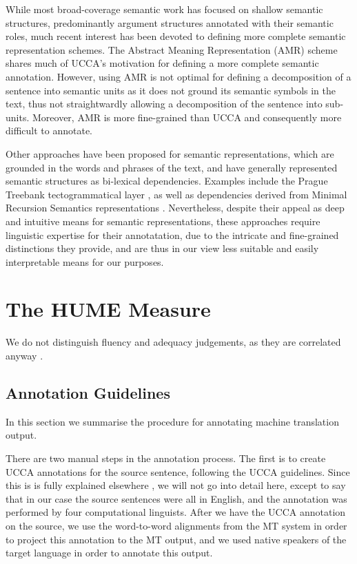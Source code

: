 \documentclass[11pt]{article}
\begin{document}
While most broad-coverage semantic work has focused on shallow semantic structures,
predominantly argument structures annotated with their semantic roles, much recent
interest has been devoted to defining more complete semantic representation schemes.
The Abstract Meaning Representation (AMR) scheme \cite{banarescu2013abstract}
shares much of UCCA's motivation for defining a more complete semantic annotation.
However, using AMR is not optimal for defining a decomposition of a sentence into semantic
units as it does not ground its semantic symbols in the text,
thus not straightwardly allowing a decomposition of the sentence into sub-units.
Moreover, AMR is more fine-grained than UCCA and consequently more difficult to annotate.

Other approaches have been proposed for semantic representations, which are grounded in the words
and phrases of the text, and have generally represented semantic structures as bi-lexical dependencies.
Examples include the Prague Treebank tectogrammatical layer \cite{hajic2012announcing}, as well
as dependencies derived from Minimal Recursion Semantics representations \cite{oepen2006discriminant}.
Nevertheless, despite their appeal as deep and intuitive means for semantic representations,
these approaches require linguistic expertise for their annotatation, due to the intricate and
fine-grained distinctions they provide, and are thus in our view less suitable and
easily interpretable means for our purposes.


\section{The HUME Measure}\label{sec:hume}

We do not distinguish fluency and adequacy judgements, as they are correlated anyway \cite{ccb}.

\subsection{Annotation Guidelines}\label{sec:guidelines}
In this section we summarise the procedure for annotating machine translation output.

There are two manual steps in the annotation process. The first is to create UCCA annotations for the source sentence,
following the UCCA guidelines. Since this is is fully explained elsewhere \cite{abend2013universal}, we will not go into detail
here, except to say that in our case the source sentences were all in English, and  the annotation was performed by four
computational linguists. After we have the UCCA annotation on 
the source, we use the word-to-word alignments from the MT system in order to project this annotation to the MT output, and
we used native speakers of the target language in order to annotate this output. 
\end{document}
